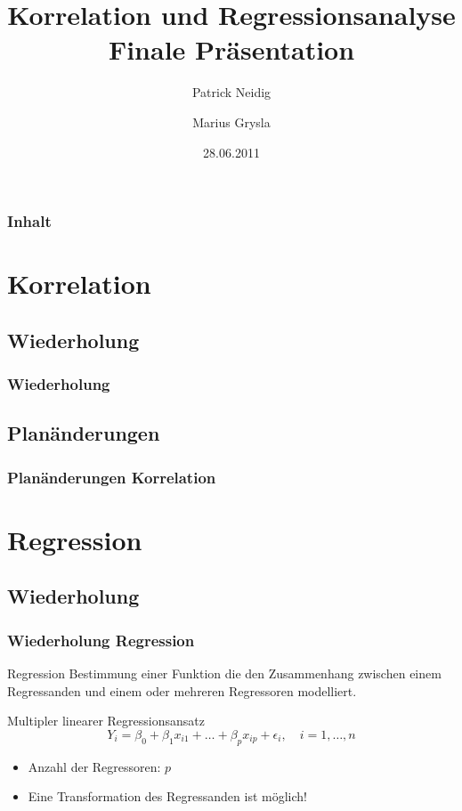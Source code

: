 \documentclass{beamer}
\begin{document}
\title{Korrelation und Regressionsanalyse\\
Finale Präsentation}
\author{Patrick Neidig \and Marius Grysla}
\date{28.06.2011}
\frame{\titlepage}

\begin{frame}
 \frametitle{Inhalt}
 \tableofcontents
\end{frame}

\section{Korrelation}

\subsection{Wiederholung}
\begin{frame}
  \frametitle{Wiederholung}

\end{frame}

\subsection{Planänderungen}
\begin{frame}
  \frametitle{Planänderungen Korrelation}

\end{frame}

\section{Regression}

\subsection{Wiederholung}
\begin{frame}
  \frametitle{Wiederholung Regression}

  \begin{block}{Regression}
    Bestimmung einer Funktion die den Zusammenhang zwischen einem Regressanden und einem oder mehreren Regressoren modelliert.
  \end{block}
  
  \pause

  \begin{block}{Multipler linearer Regressionsansatz}
    \begin{equation*}
      Y_i = \beta_0 + \beta_1 x_{i1} + \dots + \beta_p x_{ip} + \epsilon_i, \quad i = 1, \dots, n
    \end{equation*}
    \begin{itemize}
    \item Anzahl der Regressoren: $p$
    \end{itemize}
  \end{block}

  \begin{itemize}
  \item Eine Transformation des Regressanden ist möglich!
  \end{itemize}

\end{frame}
\end{document}
